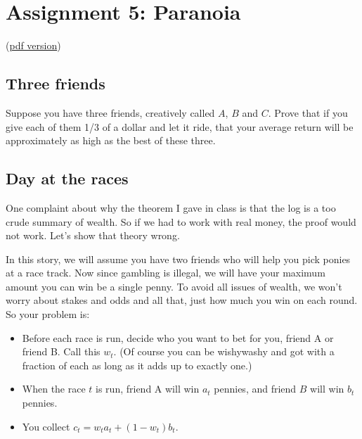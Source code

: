 \documentclass[12pt]{extarticle}
\begin{document}
\setcounter{section}{4}

\section{Assignment 5: Paranoia}


(\href{assignment5.pdf}{pdf version}) 

\subsection{Three friends}

 Suppose you have three friends, creatively called $A$, $B$ and
$C$.  Prove that if you give each of them 1/3 of a dollar and let it
ride, that your average return will be approximately as high as the
best of these three.

\subsection{Day at the races}
 One complaint about why the theorem I gave in class is that
the log is a too crude summary of wealth.  So if we had to work with
real money, the proof would not work.  Let's show that theory wrong.

In this story, we will assume you have two friends who will help you
pick ponies at a race track.  Now since gambling is illegal, we will
have your maximum amount you can win be a single penny.  To avoid all
issues of wealth, we won't worry about stakes and odds and all that,
just how much you win on each round.  So your problem is:

\begin{itemize}
\item Before each race is run, decide who you want to bet for you,
 friend A or friend B.  Call this $w_t$.  (Of course you can be
 wishywashy and got with a fraction of each as long as it adds up to
 exactly one.)
\item When the race $t$ is run, friend A will win $a_t$ pennies, and
friend $B$ will win $b_t$ pennies.
\item You collect $c_t = w_t a_t + (1-w_t) b_t$.
\end{itemize}
\end{document}
